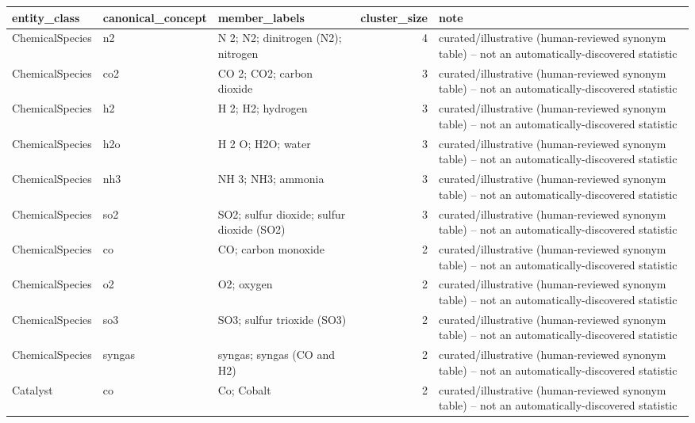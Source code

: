 \begin{tabular}{lllrl}
\toprule
entity\_class & canonical\_concept & member\_labels & cluster\_size & note \\
\midrule
ChemicalSpecies & n2 & N 2; N2; dinitrogen (N2); nitrogen & 4 & curated/illustrative (human-reviewed synonym table) -- not an automatically-discovered statistic \\
ChemicalSpecies & co2 & CO 2; CO2; carbon dioxide & 3 & curated/illustrative (human-reviewed synonym table) -- not an automatically-discovered statistic \\
ChemicalSpecies & h2 & H 2; H2; hydrogen & 3 & curated/illustrative (human-reviewed synonym table) -- not an automatically-discovered statistic \\
ChemicalSpecies & h2o & H 2 O; H2O; water & 3 & curated/illustrative (human-reviewed synonym table) -- not an automatically-discovered statistic \\
ChemicalSpecies & nh3 & NH 3; NH3; ammonia & 3 & curated/illustrative (human-reviewed synonym table) -- not an automatically-discovered statistic \\
ChemicalSpecies & so2 & SO2; sulfur dioxide; sulfur dioxide (SO2) & 3 & curated/illustrative (human-reviewed synonym table) -- not an automatically-discovered statistic \\
ChemicalSpecies & co & CO; carbon monoxide & 2 & curated/illustrative (human-reviewed synonym table) -- not an automatically-discovered statistic \\
ChemicalSpecies & o2 & O2; oxygen & 2 & curated/illustrative (human-reviewed synonym table) -- not an automatically-discovered statistic \\
ChemicalSpecies & so3 & SO3; sulfur trioxide (SO3) & 2 & curated/illustrative (human-reviewed synonym table) -- not an automatically-discovered statistic \\
ChemicalSpecies & syngas & syngas; syngas (CO and H2) & 2 & curated/illustrative (human-reviewed synonym table) -- not an automatically-discovered statistic \\
Catalyst & co & Co; Cobalt & 2 & curated/illustrative (human-reviewed synonym table) -- not an automatically-discovered statistic \\
\bottomrule
\end{tabular}
